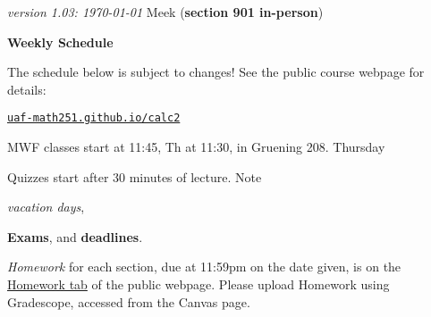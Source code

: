 \documentclass[12pt]{article}
\newcommand{\vacinline}[1]{{\color{OliveGreen} \textsl{#1}}}
\newcommand{\vac}[1]{\strut {\small {\vacinline{#1}}}}
\newcommand{\due}[1]{\strut {\color{BrickRed} \textsl{#1}}}
\newcommand{\dl}[1]{{\small \color{Purple} \textbf{#1}}}
\newcommand{\ee}[1]{\strut {\color{Blue} \textbf{#1}}}
\newcommand{\qq}[1]{\strut {\color{RedOrange} #1}}
\begin{document}
\noindent\footnotesize \emph{version 1.03: \today} \normalsize \hfill Meek (\textbf{section 901 in-person})

\bigskip
\centerline{\Large \textbf{Weekly Schedule}}

\bigskip
The schedule below is subject to changes!  See the public course webpage for details:

\medskip

\centerline{\href{https://uaf-math251.github.io/calc2/}{\texttt{uaf-math251.github.io/calc2}}}

\noindent MWF classes start at 11:45, Th at 11:30, in Gruening 208.  Thursday \qq{Quizzes} start after 30 minutes of lecture.  Note \vac{vacation days}, \ee{Exams}, and \dl{deadlines}.  \due{Homework} for each section, due at 11:59pm on the date given, is on the \href{https://uaf-math251.github.io/calc2/}{Homework tab} of the public webpage.  Please upload Homework using Gradescope, accessed from the Canvas page.

\bigskip
\end{document}

